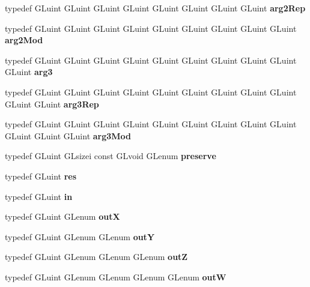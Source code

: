 \begin{DoxyCompactItemize}
\item 
typedef G\+Luint G\+Luint G\+Luint G\+Luint G\+Luint G\+Luint G\+Luint G\+Luint {\bfseries arg2\+Rep}\label{_s_d_l__opengl_8h_ae086eac70e0d701967af9657b36d7efd}

\item 
typedef G\+Luint G\+Luint G\+Luint G\+Luint G\+Luint G\+Luint G\+Luint G\+Luint G\+Luint {\bfseries arg2\+Mod}\label{_s_d_l__opengl_8h_ab1de83cb06a6a9589e484779c84bb994}

\item 
typedef G\+Luint G\+Luint G\+Luint G\+Luint G\+Luint G\+Luint G\+Luint G\+Luint G\+Luint G\+Luint {\bfseries arg3}\label{_s_d_l__opengl_8h_a525a52cc20e1aa70741e5c7dae172f25}

\item 
typedef G\+Luint G\+Luint G\+Luint G\+Luint G\+Luint G\+Luint G\+Luint G\+Luint G\+Luint G\+Luint G\+Luint {\bfseries arg3\+Rep}\label{_s_d_l__opengl_8h_afeeeff457271a76f6929b9bab61cee0e}

\item 
typedef G\+Luint G\+Luint G\+Luint G\+Luint G\+Luint G\+Luint G\+Luint G\+Luint G\+Luint G\+Luint G\+Luint G\+Luint {\bfseries arg3\+Mod}\label{_s_d_l__opengl_8h_a9c4bab1420a0f312fb144c1ffab9739b}

\item 
typedef G\+Luint G\+Lsizei const G\+Lvoid G\+Lenum {\bfseries preserve}\label{_s_d_l__opengl_8h_aab18b6b796a98c5d960c84f7d59049df}

\item 
typedef G\+Luint {\bfseries res}\label{_s_d_l__opengl_8h_a1dbb21208b9047cc8031ca9c840d3c2f}

\item 
typedef G\+Luint {\bfseries in}\label{_s_d_l__opengl_8h_a83ad0ee7f1e06b59c90271716e689080}

\item 
typedef G\+Luint G\+Lenum {\bfseries out\+X}\label{_s_d_l__opengl_8h_ad456d85656f943078bc66c1814c2c073}

\item 
typedef G\+Luint G\+Lenum G\+Lenum {\bfseries out\+Y}\label{_s_d_l__opengl_8h_ab117d69745dd2957030b968f6ee21c4d}

\item 
typedef G\+Luint G\+Lenum G\+Lenum G\+Lenum {\bfseries out\+Z}\label{_s_d_l__opengl_8h_a8b915d8cb82f30a86d175c6c5f7bb97d}

\item 
typedef G\+Luint G\+Lenum G\+Lenum G\+Lenum G\+Lenum {\bfseries out\+W}\label{_s_d_l__opengl_8h_a96a3a28dfe777a73f4956bdd24eac110}


\end{DoxyCompactItemize}
